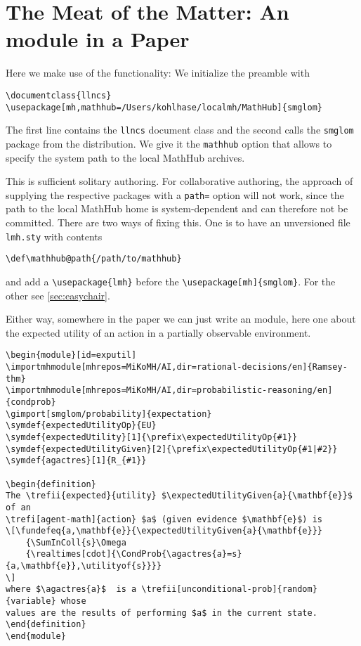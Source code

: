 \documentclass{llncs}
\begin{document}
\section{The Meat of the Matter: An \sTeX module in a Paper}\label{sec:meat}
Here we make use of the \sTeX functionality: We initialize the preamble with
\begin{footnotesize}
\begin{verbatim}
\documentclass{llncs}
\usepackage[mh,mathhub=/Users/kohlhase/localmh/MathHub]{smglom}
\end{verbatim}
  The first line contains the \texttt{llncs} document class and the second calls the
  \texttt{smglom} package from the \sTeX distribution. We give it the \texttt{mathhub}
  option that allows to specify the system path to the local MathHub
  archives.

  This is sufficient solitary authoring. For collaborative authoring, the approach of
  supplying the respective \sTeX packages with a \texttt{path=} option will not work,
  since the path to the local MathHub home is system-dependent and can therefore not be
  committed. There are two ways of fixing this.  One is to have an unversioned file
  \verb|lmh.sty| with contents
\begin{verbatim}
\def\mathhub@path{/path/to/mathhub} 
\end{verbatim}
  and add a \verb|\usepackage{lmh}| before the \verb|\usepackage[mh]{smglom}|.  For the
  other see \cref{sec:easychair}.

  Either way, somewhere in the paper we can just write an \sTeX module, here one about the
  expected utility of an action in a partially observable environment.

\begin{verbatim}
\begin{module}[id=exputil]
\importmhmodule[mhrepos=MiKoMH/AI,dir=rational-decisions/en]{Ramsey-thm}
\importmhmodule[mhrepos=MiKoMH/AI,dir=probabilistic-reasoning/en]{condprob}
\gimport[smglom/probability]{expectation}
\symdef{expectedUtilityOp}{EU}
\symdef{expectedUtility}[1]{\prefix\expectedUtilityOp{#1}}
\symdef{expectedUtilityGiven}[2]{\prefix\expectedUtilityOp{#1|#2}}
\symdef{agactres}[1]{R_{#1}}

\begin{definition}
The \trefii{expected}{utility} $\expectedUtilityGiven{a}{\mathbf{e}}$ of an
\trefi[agent-math]{action} $a$ (given evidence $\mathbf{e}$) is
\[\fundefeq{a,\mathbf{e}}{\expectedUtilityGiven{a}{\mathbf{e}}}
    {\SumInColl{s}\Omega
    {\realtimes[cdot]{\CondProb{\agactres{a}=s}{a,\mathbf{e}},\utilityof{s}}}}
\]
where $\agactres{a}$  is a \trefii[unconditional-prob]{random}{variable} whose 
values are the results of performing $a$ in the current state.
\end{definition}
\end{module}
\end{verbatim}
\end{footnotesize}
\end{document}
